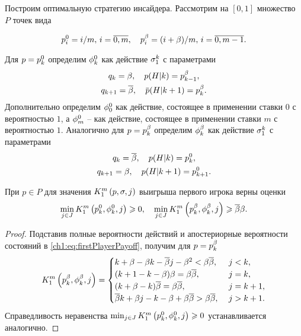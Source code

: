 {Построим оптимальную стратегию инсайдера. Рассмотрим на $[0,1]$ множество $P$
точек вида

\[
\pEven[i] = i/m, \, i = \overline{0, m}, \quad \pOdd[i] = (i + \Co)/m, \, i =
\overline{0, m - 1}.
\]

Для $p = \pEven$ определим $\fEven$ как действие $\fGeneral{k}$ с параметрами
\begin{gather*}
  q_k = \Co, \quad p(H|k) = \pOdd[k-1],\\
  q_{k+1} = \DCo, \quad \p(H|k + 1) = \pOdd[k].
\end{gather*}
Дополнительно определим $\fEven[0]$ как действие, состоящее в применении ставки
$0$ с вероятностью $1$, а $\fEven[m]$ -- как действие, состоящее в применении
ставки $m$ с вероятностью $1$. Аналогично для $p = \pOdd$ определим $\fOdd$ как
действие $\fGeneral{k}$ с параметрами
\begin{gather*}
  q_k = \DCo, \quad p(H|k) = \pEven[k],\\
  q_{k+1} = \Co, \quad p(H|k + 1) = \pEven[k+1].
\end{gather*}

\begin{proposition}
  При $p \in P$ для значения $\firstPlayerPayoff{1}{p}{\sigma}{j}$ выигрыша
  первого игрока верны оценки
  \begin{equation}
    \label{ch1:eq:lowerBound:inequalities}
    \min_{j \in J}
    \firstPlayerPayoff{1}{\pEven}{\fEven}{j} \geq 0,
    \quad
    \min_{j \in J}
    \firstPlayerPayoff{1}{\pOdd}{\fOdd}{j} \geq \DCo\Co.
  \end{equation}
\end{proposition}
\begin{proof}
  Подставив полные вероятности действий и апостериорные вероятности состояний в
  \eqref{ch1:eq:firstPlayerPayoff}, получим для $p = \pOdd[k]$
  \begin{equation*}
    \firstPlayerPayoff{1}{\pOdd}{\fOdd}{j} = \begin{cases}
      k + \Co - \Co k - \DCo j - \Co^2 < \Co \DCo,\ & j < k,\\
      (k + 1 - k - \Co) \Co = \Co \DCo,\ & j = k,\\
      (k + \Co - k) \DCo = \Co \DCo,\ & j = k+1,\\
      \DCo k + \Co j - k - \Co + \Co \DCo > \Co \DCo,\ & j > k+1.
    \end{cases}
  \end{equation*}
  Справедливость неравенства %
  $\min_{j \in J} \firstPlayerPayoff{1}{\pEven}{\fEven}{j} \geq 0$ %
  устанавливается аналогично.
\end{proof}

}
